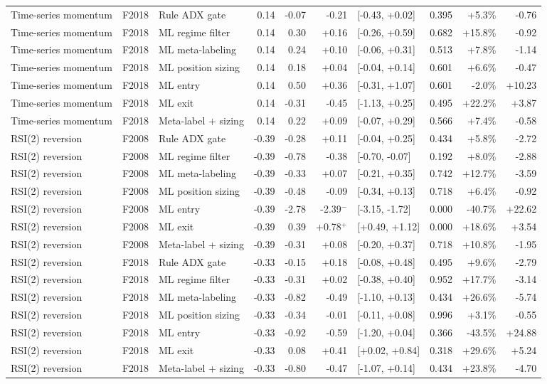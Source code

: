 \begin{longtable}{p{2.4cm} l p{2.5cm} r r r l r r r}
Time-series momentum & F2018 & Rule ADX gate & 0.14 & -0.07 & -0.21 & [-0.43, +0.02] & 0.395 & +5.3\% & -0.76 \\
Time-series momentum & F2018 & ML regime filter & 0.14 & 0.30 & +0.16 & [-0.26, +0.59] & 0.682 & +15.8\% & -0.92 \\
Time-series momentum & F2018 & ML meta-labeling & 0.14 & 0.24 & +0.10 & [-0.06, +0.31] & 0.513 & +7.8\% & -1.14 \\
Time-series momentum & F2018 & ML position sizing & 0.14 & 0.18 & +0.04 & [-0.04, +0.14] & 0.601 & +6.6\% & -0.47 \\
Time-series momentum & F2018 & ML entry & 0.14 & 0.50 & +0.36 & [-0.31, +1.07] & 0.601 & -2.0\% & +10.23 \\
Time-series momentum & F2018 & ML exit & 0.14 & -0.31 & -0.45 & [-1.13, +0.25] & 0.495 & +22.2\% & +3.87 \\
Time-series momentum & F2018 & Meta-label + sizing & 0.14 & 0.22 & +0.09 & [-0.07, +0.29] & 0.566 & +7.4\% & -0.58 \\
RSI(2) reversion & F2008 & Rule ADX gate & -0.39 & -0.28 & +0.11 & [-0.04, +0.25] & 0.434 & +5.8\% & -2.72 \\
RSI(2) reversion & F2008 & ML regime filter & -0.39 & -0.78 & -0.38 & [-0.70, -0.07] & 0.192 & +8.0\% & -2.88 \\
RSI(2) reversion & F2008 & ML meta-labeling & -0.39 & -0.33 & +0.07 & [-0.21, +0.35] & 0.742 & +12.7\% & -3.59 \\
RSI(2) reversion & F2008 & ML position sizing & -0.39 & -0.48 & -0.09 & [-0.34, +0.13] & 0.718 & +6.4\% & -0.92 \\
RSI(2) reversion & F2008 & ML entry & -0.39 & -2.78 & -2.39$^{-}$ & [-3.15, -1.72] & 0.000 & -40.7\% & +22.62 \\
RSI(2) reversion & F2008 & ML exit & -0.39 & 0.39 & +0.78$^{+}$ & [+0.49, +1.12] & 0.000 & +18.6\% & +3.54 \\
RSI(2) reversion & F2008 & Meta-label + sizing & -0.39 & -0.31 & +0.08 & [-0.20, +0.37] & 0.718 & +10.8\% & -1.95 \\
RSI(2) reversion & F2018 & Rule ADX gate & -0.33 & -0.15 & +0.18 & [-0.08, +0.48] & 0.495 & +9.6\% & -2.79 \\
RSI(2) reversion & F2018 & ML regime filter & -0.33 & -0.31 & +0.02 & [-0.38, +0.40] & 0.952 & +17.7\% & -3.14 \\
RSI(2) reversion & F2018 & ML meta-labeling & -0.33 & -0.82 & -0.49 & [-1.10, +0.13] & 0.434 & +26.6\% & -5.74 \\
RSI(2) reversion & F2018 & ML position sizing & -0.33 & -0.34 & -0.01 & [-0.11, +0.08] & 0.996 & +3.1\% & -0.55 \\
RSI(2) reversion & F2018 & ML entry & -0.33 & -0.92 & -0.59 & [-1.20, +0.04] & 0.366 & -43.5\% & +24.88 \\
RSI(2) reversion & F2018 & ML exit & -0.33 & 0.08 & +0.41 & [+0.02, +0.84] & 0.318 & +29.6\% & +5.24 \\
RSI(2) reversion & F2018 & Meta-label + sizing & -0.33 & -0.80 & -0.47 & [-1.07, +0.14] & 0.434 & +23.8\% & -4.70 \\
\end{longtable}
